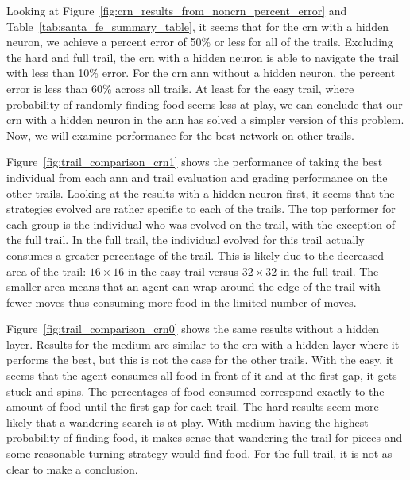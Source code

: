 Looking at Figure~\ref{fig:crn_results_from_noncrn_percent_error} and Table~\ref{tab:santa_fe_summary_table}, it seems that for the \gls{crn} with a hidden neuron, we achieve a percent error of 50\% or less for all of the trails. Excluding the hard and full trail, the \gls{crn} with a hidden neuron is able to navigate the trail with less than 10\% error. For the \gls{crn} \gls{ann} without a hidden neuron, the percent error is less than 60\% across all trails.  At least for the easy trail, where probability of randomly finding food seems less at play, we can conclude that our \gls{crn} with a hidden neuron in the \gls{ann} has solved a simpler version of this problem. Now, we will examine performance for the best network on other trails.

Figure~\ref{fig:trail_comparison_crn1} shows the performance of taking the best individual from each \gls{ann} and trail evaluation and grading performance on the other trails. Looking at the results with a hidden neuron first, it seems that the strategies evolved are rather specific to each of the trails. The top performer for each group is the individual who was evolved on the trail, with the exception of the full trail. In the full trail, the individual evolved for this trail actually consumes a greater percentage of the trail. This is likely due to the decreased area of the trail: $16 \times 16$ in the easy trail versus $32 \times 32$ in the full trail. The smaller area means that an agent can wrap around the edge of the trail with fewer moves thus consuming more food in the limited number of moves.

Figure~\ref{fig:trail_comparison_crn0} shows the same results without a hidden layer. Results for the medium are similar to the \gls{crn} with a hidden layer where it performs the best, but this is not the case for the other trails. With the easy, it seems that the agent consumes all food in front of it and at the first gap, it gets stuck and spins. The percentages of food consumed correspond exactly to the amount of food until the first gap for each trail. The hard results seem more likely that a wandering search is at play. With medium having the highest probability of finding food, it makes sense that wandering the trail for pieces and some reasonable turning strategy would find food. For the full trail, it is not as clear to make a conclusion.

